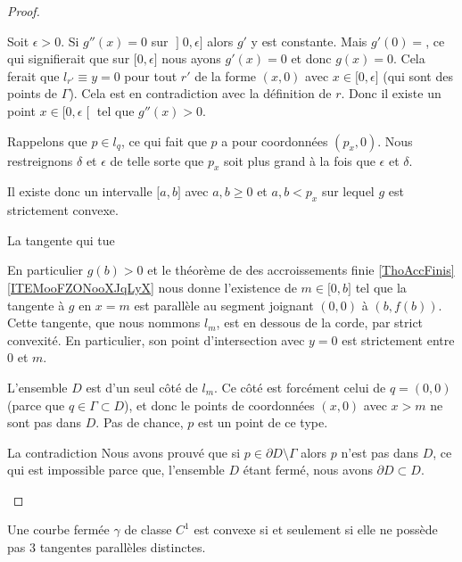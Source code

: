 \begin{proof}
\begin{subproof}
        Soit \( \epsilon>0\). Si \( g''(x)=0\) sur \( \mathopen] 0 , \epsilon \mathclose]\) alors \( g'\) y est constante. Mais \( g'(0)=\), ce qui signifierait que sur \( \mathopen[ 0 , \epsilon \mathclose]\) nous ayons \( g'(x)=0\) et donc \( g(x)=0\). Cela ferait que \( l_{r'}\equiv y=0\) pour tout \( r'\) de la forme \( (x,0)\) avec \( x\in \mathopen[ 0 , \epsilon \mathclose]\) (qui sont des points de \( \Gamma\)). Cela est en contradiction avec la définition de \( r\). Donc il existe un point \(x\in \mathopen[ 0 , \epsilon \mathclose[\) tel que \( g''(x)>0\).

        Rappelons que \( p\in l_q\), ce qui fait que \( p\) a pour coordonnées \( (p_x,0)\). Nous restreignons \( \delta\) et \( \epsilon\) de telle sorte que \( p_x\) soit plus grand à la fois que \( \epsilon\) et \(\delta\).

        Il existe donc un intervalle \( \mathopen[ a , b \mathclose]\) avec \( a,b\geq 0\) et \( a,b<p_x\) sur lequel \( g\) est strictement convexe. 
        
    \item[La tangente qui tue]

        En particulier \( g(b)>0\) et le théorème de des accroissements finie \ref{ThoAccFinis}\ref{ITEMooFZONooXJqLyX} nous donne l'existence de \( m\in\mathopen[ 0 , b \mathclose]\) tel que la tangente à \( g\) en \( x=m\) est parallèle au segment joignant \( (0,0)\) à \( (b,f(b))\). Cette tangente, que nous nommons \( l_m\), est en dessous de la corde, par strict convexité. En particulier, son point d'intersection avec \( y=0\) est strictement entre \( 0\) et \( m\).

        L'ensemble \( D\) est d'un seul côté de \(l_m\). Ce côté est forcément celui de \( q=(0,0)\) (parce que \( q\in \Gamma\subset D\)), et donc le points de coordonnées \( (x,0)\) avec \( x>m\) ne sont pas dans \(D\). Pas de chance, \( p\) est un point de ce type.

    \item[La contradiction]
        Nous avons prouvé que si \( p\in \partial D\setminus \Gamma\) alors \( p\) n'est pas dans \( D\), ce qui est impossible parce que, l'ensemble \( D\) étant fermé, nous avons \( \partial D\subset D\).
    \end{subproof}
\end{proof}

\begin{lemma}        \label{LEMooUEKQooWhGyKn}
    Une courbe fermée \( \gamma\) de classe \( C^1\) est convexe si et seulement si elle ne possède pas \( 3\) tangentes parallèles distinctes.
\end{lemma}

